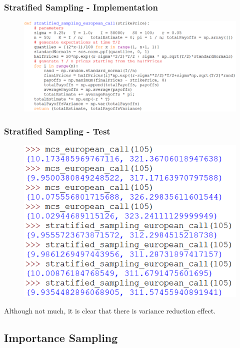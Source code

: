 \documentclass{beamer}
\begin{document}
\begin{frame}
\frametitle{Stratified Sampling - Implementation}
\begin{figure}[H]
	\includegraphics[scale=0.38]{stratified_sampling_european_call_proportional.png}
\end{figure}
\end{frame}

\begin{frame}
\frametitle{Stratified Sampling - Test}
\begin{figure}[H]
	\includegraphics[scale=0.45]{stratified_sampling_european_call_proportional_test.png}
\end{figure}
Although not much, it is clear that there is variance reduction effect.
\end{frame}

\subsection{Importance Sampling}
\end{document}
